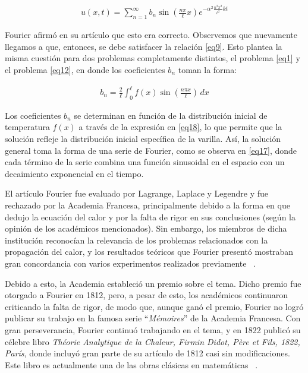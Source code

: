  
\begin{equation} \label{eq17}
	\begin{split}
		u(x,t) = \sum_{n=1}^{\infty} b_n \sin \left( \frac{n \pi}{\ell} x \right) e^{- \alpha^2 \frac{n^2 \pi^2}{\ell^2} k t}
	\end{split}
\end{equation}

Fourier afirmó en su artículo que esto era correcto. Observemos que nuevamente llegamos a que, entonces, se debe satisfacer la relación \eqref{eq9}. Esto plantea la misma cuestión para dos problemas completamente distintos, el problema \eqref{eq1} y el problema \eqref{eq12}, en donde los coeficientes  \( b_n \) toman la forma:

\begin{equation} \label{eq18}
	\begin{split}
		b_n = \frac{2}{\ell} \int_0^{\ell} f(x) \sin \left( \frac{n \pi x}{\ell} \right) \, dx
	\end{split}
\end{equation}

Los coeficientes \( b_n \) se determinan en función de la distribución inicial de temperatura \( f(x) \) a través de la expresión en \eqref{eq18}, lo que permite que la solución refleje la distribución inicial específica de la varilla. Así, la solución general toma la forma de una serie de Fourier, como se observa en \eqref{eq17}, donde cada término de la serie combina una función sinusoidal en el espacio con un decaimiento exponencial en el tiempo. \newline

El artículo Fourier fue evaluado por Lagrange, Laplace y Legendre y fue rechazado por la Academia Francesa, principalmente debido a la forma en que dedujo la ecuación del calor y por la falta de rigor en sus conclusiones (según la opinión de los académicos mencionados). Sin embargo, los miembros de dicha institución reconocían la relevancia de los problemas relacionados con la propagación del calor, y los resultados teóricos que Fourier presentó mostraban gran concordancia con varios experimentos realizados previamente ~\cite{historia-alambert-fourier-euler}. 

Debido a esto, la Academia estableció un premio sobre el tema. Dicho premio fue otorgado a Fourier en 1812, pero, a pesar de esto, los académicos continuaron criticando la falta de rigor, de modo que, aunque ganó el premio, Fourier no logró publicar su trabajo en la famosa serie “\textit{Mémoires}” de la Academia Francesa. Con gran perseverancia, Fourier continuó trabajando en el tema, y en 1822 publicó su célebre libro \textit{Théorie Analytique de la Chaleur, Firmin Didot, Père et Fils, 1822, París}, donde incluyó gran parte de su artículo de 1812 casi sin modificaciones. Este libro es actualmente una de las obras clásicas en matemáticas ~\cite{historia-alambert-fourier-euler}.


